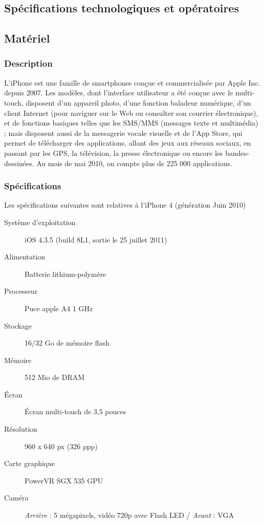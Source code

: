 \documentclass[a4paper,12pt]{report}
\begin{document}
\begin{onehalfspace}
\chapter{Spécifications technologiques et opératoires}


\section{Matériel}
\subsection{Description}
L'iPhone  est une famille de smartphones conçue et commercialisée par Apple Inc. depuis 2007. Les modèles, dont l'interface utilisateur a été conçue avec le multi-touch, disposent d'un appareil photo, d'une fonction baladeur numérique, d'un client Internet (pour naviguer sur le Web ou consulter son courrier électronique), et de fonctions basiques telles que les SMS/MMS (messages texte et multimédia) ; mais disposent aussi de la messagerie vocale visuelle et de l'App Store, qui permet de télécharger des applications, allant des jeux aux réseaux sociaux, en passant par les GPS, la télévision, la presse électronique ou encore les bandes-dessinées. Au mois de mai 2010, on compte plus de 225 000 applications.

\subsection{Spécifications}
Les spécifications suivantes sont relatives à l'iPhone 4 (génération Juin 2010)
  \begin{description}
  \item[Système d'exploitation] iOS 4.3.5 (build 8L1, sortie le 25 juillet 2011)
  \item[Alimentation] Batterie lithium-polymère
  \item[Processeur] Puce apple A4 1 GHz
  \item[Stockage]  16/32 Go de mémoire flash
  \item[Mémoire] 512 Mio de DRAM
  \item[Écran] Écran multi-touch de 3,5 pouces
  \item[Résolution] 960 x 640 px (326 ppp)
  \item[Carte graphique]  PowerVR SGX 535 GPU
  \item[Caméra] \emph{Arrière} : 5 mégapixels, vidéo 720p avec Flash LED / \emph{Avant} : VGA
  \end{description}


\end{onehalfspace}
\end{document}
